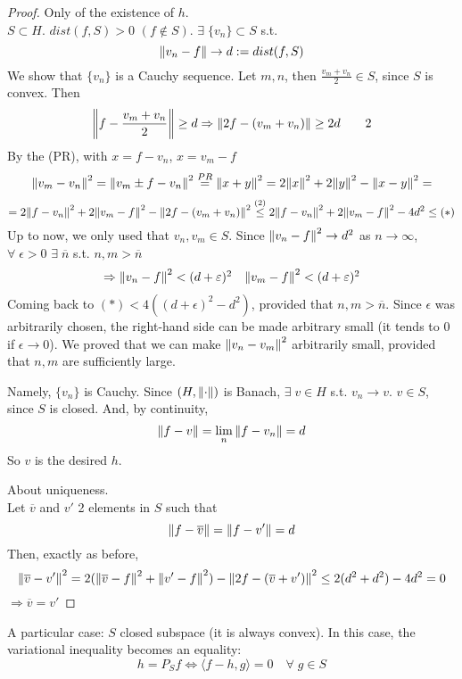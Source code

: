 \begin{proof}
    Only of the existence of \(h\). \\
    \(S \subset H\). \(dist(f, S) >0\) \((f \notin S )\). \(\exists \; \{v_n\} \subset S\) s.t. 
    \[
        \norm{v_n -f} \to d := dist(f, S)    
    \] 
    We show that \(\{v_n\}\) is a Cauchy sequence. Let \(m, n\), then \(\frac{v_m + v_n}{2} \in S\), since \(S\) is convex. Then 
    \[
        \norm{f - \frac{v_m + v_n}{2}} \geq d \Rightarrow \norm{2f - (v_m + v_n)} \geq 2d \tag*{2}
    \]
    By the (PR), with \(x=f-v_n\), \(x=v_m-f\)
    \[
        \norm{v_m - v_n}^2 
        = \norm{v_m \pm f - v_n}^2 
        \overset{PR }{=} \norm{x+y}^2
        = 2\norm{x}^2 + 2 \norm{y}^2 - \norm{x-y}^2 =
    \]
    \[
        = 2 \norm{f-v_n}^2 + 2 \norm{v_m - f }^2 - \norm{2f - (v_m + v_n)}^2
        \overset{(2)}{\leq} 2 \norm{f - v_n}^2 + 2 \norm{v_m - f}^2 - 4d^2 \leq (*)
    \]
    Up to now, we only used that \(v_n , v_m \in S\). Since \(\norm{v_n -f }^2 \to d^2\) as \(n \to \infty\), \(\forall\; \epsilon>0 \) \(\exists \; \overline{n}\) s.t. \(n, m > \overline{n}\)
    \[
        \begin{array}{ll}
            \Rightarrow \norm{v_n - f}^2 < (d+\varepsilon)^2 & \norm{v_m - f}^2 < (d+\varepsilon)^2
        \end{array}
    \]
    Coming back to \((*)< 4((d+\epsilon)^2 -d^2)\), provided that \(n, m > \overline{n}\). Since \(\epsilon\) was arbitrarily chosen, the right-hand side can be made arbitrary small (it tends to 0 if \(\epsilon \to 0\)). 
    We proved that we can make \(\norm{v_n - v_m}^2\) arbitrarily small, provided that \(n, m\) are sufficiently large.
    
    Namely, \(\{v_n\}\) is Cauchy. Since \((H, \norm{\cdot})\) is Banach, \(\exists \; v \in H\) s.t. \(v_n \to v\). \(v \in S\), since \(S\) is closed. And, by continuity, 
    \[
        \norm{f-v} = \lim_n \norm{f - v_n} = d
    \]
    So \(v\) is the desired \(h\).
    
    About uniqueness. \\
    Let \(\overline{v}\) and \(v'\) 2 elements in \(S\) such that
    \[
        \norm{f- \overline{v}} = \norm{f - v'} = d
    \]
    Then, exactly as before, 
    \[
        \norm{\overline{v} - v'}^2 = 2(\norm{\overline{v} - f}^2 + \norm{v' -f}^2) - \norm{2f - (\overline{v}+v')}^2 \leq 2 (d^2+d^2)-4d^2 = 0
    \]
    \(\Rightarrow \overline{v} = v'\)
\end{proof}

\begin{remark}
    A particular case: \(S\) closed subspace (it is always convex). In this case, the variational inequality becomes an equality:
    \[
        h = P_S f \Leftrightarrow \langle f-h, g\rangle = 0 \quad  \forall \; g \in S
    \]
\end{remark}


